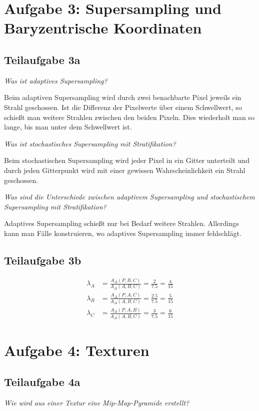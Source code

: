 \documentclass[a4paper]{scrartcl}
\begin{document}
\section*{Aufgabe 3: Supersampling und Baryzentrische Koordinaten}
\subsection*{Teilaufgabe 3a}
\textit{Was ist adaptives Supersampling?}

Beim adaptiven Supersampling wird durch zwei benachbarte Pixel jeweils ein
Strahl geschossen. Ist die Differenz der Pixelwerte über einem Schwellwert, so
schießt man weitere Strahlen zwischen den beiden Pixeln. Dies wiederholt man
so lange, bis man unter dem Schwellwert ist.

\textit{Was ist stochastisches Supersampling mit Stratifikation?}

Beim stochastischen Supersampling wird jeder Pixel in ein Gitter unterteilt
und durch jeden Gitterpunkt wird mit einer gewissen Wahrscheinlichkeit ein
Strahl geschossen.

\textit{Was sind die Unterschiede zwischen adaptivem Supersampling und stochastischem
Supersampling mit Stratifikation?}

Adaptives Supersampling schießt nur bei Bedarf weitere Strahlen. Allerdings
kann man Fälle konstruieren, wo adaptives Supersampling immer fehlschlägt.

\subsection*{Teilaufgabe 3b}

\begin{align}
    \lambda_A &= \frac{A_\Delta(P,B,C)}{A_\Delta(A,B,C)} = \frac{2}{7.5} = \frac{4}{15}\\
    \lambda_B &= \frac{A_\Delta(P,A,C)}{A_\Delta(A,B,C)} = \frac{2.5}{7.5} = \frac{5}{15}\\
    \lambda_C &= \frac{A_\Delta(P,A,B)}{A_\Delta(A,B,C)} = \frac{3}{7.5} = \frac{6}{15}
\end{align}

\section*{Aufgabe 4: Texturen}
\subsection*{Teilaufgabe 4a}
\textit{Wie wird aus einer Textur eine Mip-Map-Pyramide erstellt?}
\end{document}
